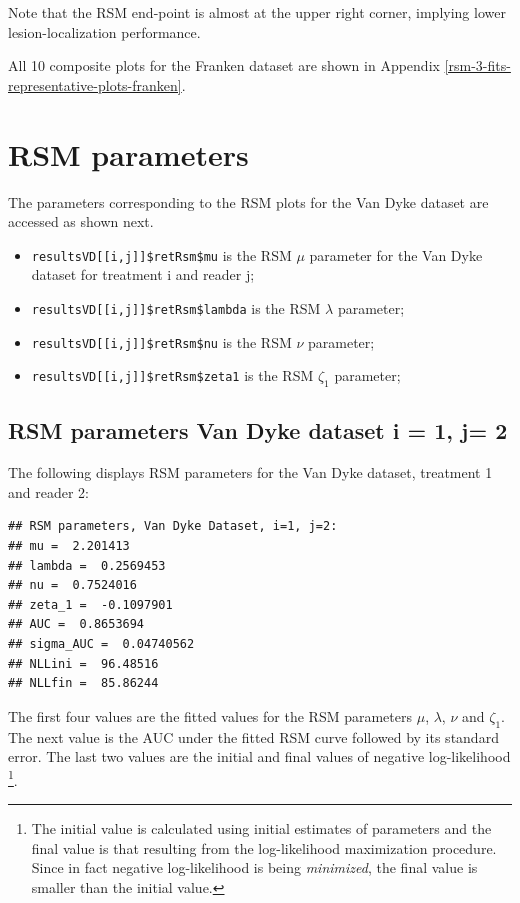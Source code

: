 \documentclass[
]{book}
\providecommand{\tightlist}{%
  \setlength{\itemsep}{0pt}\setlength{\parskip}{0pt}}
\begin{document}
Note that the RSM end-point is almost at the upper right corner, implying lower lesion-localization performance.

All 10 composite plots for the Franken dataset are shown in Appendix \ref{rsm-3-fits-representative-plots-franken}.

\hypertarget{rsm-3-fits-rsm-parameters}{%
\section{RSM parameters}\label{rsm-3-fits-rsm-parameters}}

The parameters corresponding to the RSM plots for the Van Dyke dataset are accessed as shown next.

\begin{itemize}
\tightlist
\item
  \texttt{resultsVD{[}{[}i,j{]}{]}\$retRsm\$mu} is the RSM \(\mu\) parameter for the Van Dyke dataset for treatment i and reader j;
\item
  \texttt{resultsVD{[}{[}i,j{]}{]}\$retRsm\$lambda} is the RSM \(\lambda\) parameter;\\
\item
  \texttt{resultsVD{[}{[}i,j{]}{]}\$retRsm\$nu} is the RSM \(\nu\) parameter;
\item
  \texttt{resultsVD{[}{[}i,j{]}{]}\$retRsm\$zeta1} is the RSM \(\zeta_1\) parameter;
\end{itemize}

\hypertarget{rsm-parameters-van-dyke-dataset-i-1-j-2}{%
\subsection{RSM parameters Van Dyke dataset i = 1, j= 2}\label{rsm-parameters-van-dyke-dataset-i-1-j-2}}

The following displays RSM parameters for the Van Dyke dataset, treatment 1 and reader 2:

\begin{verbatim}
## RSM parameters, Van Dyke Dataset, i=1, j=2: 
## mu =  2.201413 
## lambda =  0.2569453 
## nu =  0.7524016 
## zeta_1 =  -0.1097901 
## AUC =  0.8653694 
## sigma_AUC =  0.04740562 
## NLLini =  96.48516 
## NLLfin =  85.86244
\end{verbatim}

The first four values are the fitted values for the RSM parameters \(\mu\), \(\lambda\), \(\nu\) and \(\zeta_1\). The next value is the AUC under the fitted RSM curve followed by its standard error. The last two values are the initial and final values of negative log-likelihood \footnote{The initial value is calculated using initial estimates of parameters and the final value is that resulting from the log-likelihood maximization procedure. Since in fact negative log-likelihood is being \emph{minimized}, the final value is smaller than the initial value.}.
\end{document}
